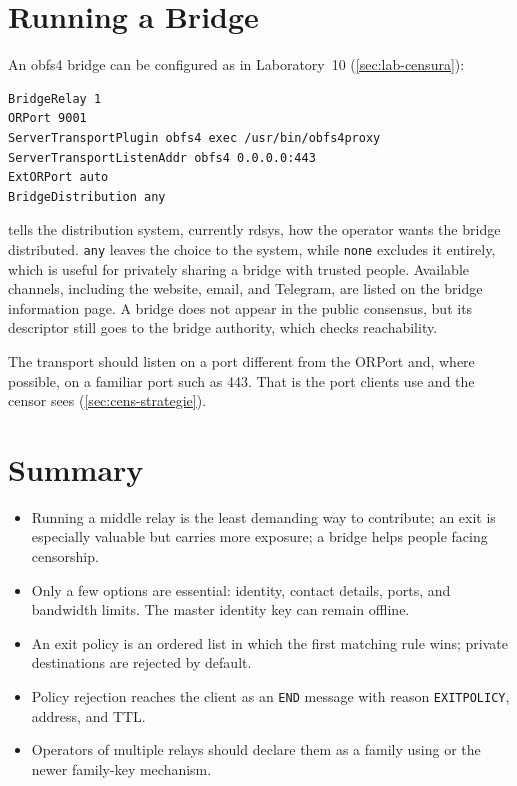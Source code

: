\section{Running a Bridge}\label{sec:relay-bridge}

An obfs4 bridge can be configured as in Laboratory~10 (\cref{sec:lab-censura}):
\begin{lstlisting}[numbers=none]
BridgeRelay 1
ORPort 9001
ServerTransportPlugin obfs4 exec /usr/bin/obfs4proxy
ServerTransportListenAddr obfs4 0.0.0.0:443
ExtORPort auto
BridgeDistribution any
\end{lstlisting}
 tells the distribution system, currently rdsys, how the operator wants the bridge distributed. \texttt{any} leaves the choice to the system, while \texttt{none} excludes it entirely, which is useful for privately sharing a bridge with trusted people. Available channels, including the website, email, and Telegram, are listed on the bridge information page. A bridge does not appear in the public consensus, but its descriptor still goes to the bridge authority, which checks reachability.

The transport should listen on a port different from the ORPort and, where possible, on a familiar port such as 443. That is the port clients use and the censor sees (\cref{sec:cens-strategie}).

\section*{Summary}
\begin{itemize}
  \item Running a middle relay is the least demanding way to contribute; an exit is especially valuable but carries more exposure; a bridge helps people facing censorship.
  \item Only a few options are essential: identity, contact details, ports, and bandwidth limits. The master identity key can remain offline.
  \item An exit policy is an ordered list in which the first matching rule wins; private destinations are rejected by default.
  \item Policy rejection reaches the client as an \texttt{END} message with reason \texttt{EXITPOLICY}, address, and TTL.
  \item Operators of multiple relays should declare them as a family using  or the newer family-key mechanism.
\end{itemize}

